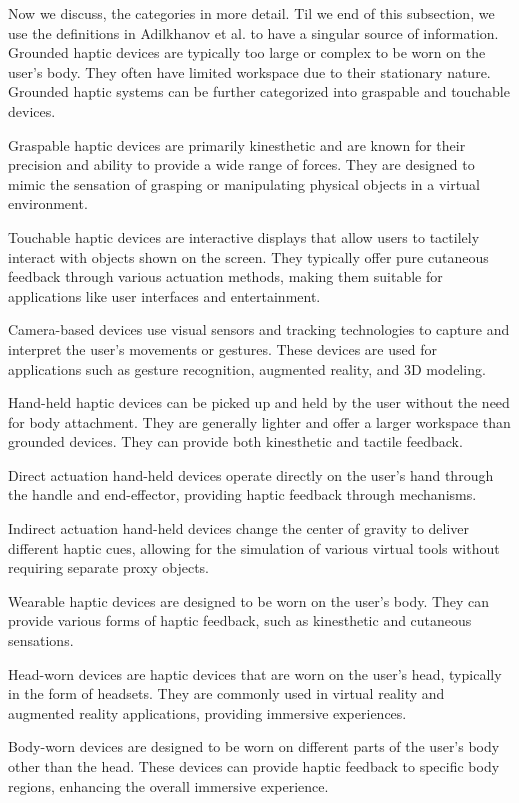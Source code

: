 Now we discuss, the categories in more detail. Til we end of this subsection, we use the definitions in Adilkhanov et al.\cite{Adilkhanov22} to have a singular source of information. Grounded haptic devices are typically too large or complex to be worn on the user's body. They often have limited workspace due to their stationary nature. Grounded haptic systems can be further categorized into graspable and touchable devices. 

Graspable haptic devices are primarily kinesthetic and are known for their precision and ability to provide a wide range of forces. They are designed to mimic the sensation of grasping or manipulating physical objects in a virtual environment. 

Touchable haptic devices are interactive displays that allow users to tactilely interact with objects shown on the screen. They typically offer pure cutaneous feedback through various actuation methods, making them suitable for applications like user interfaces and entertainment.

Camera-based devices use visual sensors and tracking technologies to capture and interpret the user's movements or gestures. These devices are used for applications such as gesture recognition, augmented reality, and 3D modeling. 


Hand-held haptic devices can be picked up and held by the user without the need for body attachment. They are generally lighter and offer a larger workspace than grounded devices. They can provide both kinesthetic and tactile feedback. 

Direct actuation hand-held devices operate directly on the user's hand through the handle and end-effector, providing haptic feedback through mechanisms. 

Indirect actuation hand-held devices change the center of gravity to deliver different haptic cues, allowing for the simulation of various virtual tools without requiring separate proxy objects. 

Wearable haptic devices are designed to be worn on the user's body. They can provide various forms of haptic feedback, such as kinesthetic and cutaneous sensations. 

Head-worn devices are haptic devices that are worn on the user's head, typically in the form of headsets. They are commonly used in virtual reality and augmented reality applications, providing immersive experiences.
 
Body-worn devices are designed to be worn on different parts of the user's body other than the head. These devices can provide haptic feedback to specific body regions, enhancing the overall immersive experience.

